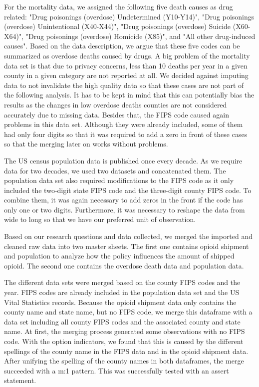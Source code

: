 \documentclass[12pt,letterpaper]{article}
\begin{document}
For the mortality data, we assigned the following five death causes as drug related: "Drug poisonings (overdose) Undetermined (Y10-Y14)", "Drug poisonings (overdose) Unintentional (X40-X44)", "Drug poisonings (overdose) Suicide (X60-X64)", "Drug poisonings (overdose) Homicide (X85)", and "All other drug-induced causes". Based on the data description, we argue that these five codes can be summarized as overdose deaths caused by drugs. A big problem of the mortality data set is that due to privacy concerns, less than 10 deaths per year in a given county in a given category are not reported at all. We decided against imputing data to not invalidate the high quality data so that these cases are not part of the following analysis. It has to be kept in mind that this can potentially bias the results as the changes in low overdose deaths counties are not considered accurately due to missing data.  Besides that, the FIPS code caused again problems in this data set. Although they were already included, some of them had only four digits so that it was required to add a zero in front of these cases so that the merging later on works without problems.

The US census population data is published once every decade. As we require data for two decades, we used two datasets and concatenated them. The population data set also required modifications to the FIPS code as it only included the two-digit state FIPS code and the three-digit county FIPS code. To combine them, it was again necessary to add zeros in the front if the code has only one or two digits. Furthermore, it was necessary to reshape the data from wide to long so that we have our preferred unit of observation.

Based on our research questions and data collected, we merged the imported and cleaned raw data into two master sheets. The first one contains opioid shipment and population to analyze how the policy influences the amount of shipped opioid. The second one contains the overdose death data and population data. 

The different data sets were merged based on the county FIPS codes and the year. FIPS codes are already included in the population data set and the US Vital Statistics records. Because the opioid shipment data only contains the county name and state name, but no FIPS code, we merge this dataframe with a data set including all county FIPS codes and the associated county and state name. At first, the merging process generated some observations with no FIPS code. With the option indicators, we found that this is caused by the different spellings of the county name in the FIPS data and in the opioid shipment data. After unifying the spelling of the county names in both dataframes, the merge succeeded with a m:1 pattern. This was successfully tested with an assert statement.
\end{document}
